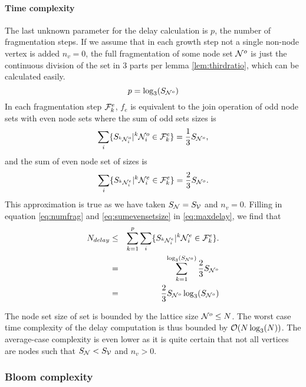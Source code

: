 \paragraph{Time complexity}
The last unknown parameter for the delay calculation is $p$, the number of fragmentation steps. If we assume that in each growth step not a single non-node vertex is added $n_v = 0$, the full fragmentation of some node set $\mathcal{N}^o$ is just the continuous division of the set in 3 parts per lemma \ref{lem:thirdratio}, which can be calculated easily.
\begin{equation}\label{eq:numfrag}
  p = \log_3(S_{\mathcal{N}^o})
\end{equation}
In each fragmentation step $\mathcal{F}^e_k$, $f_e$ is equivalent to the join operation of odd node sets with even node sets where the sum of odd sets sizes is
\begin{equation}\label{eq:sumoddsetsize}
  \sum_i \{ S_{{}^{k}\mathcal{N}_i^o} | {}^{k}\mathcal{N}_i^o \in \mathcal{F}^e_k \} = \frac{1}{3}S_{\mathcal{N}^o},
\end{equation}
and the sum of even node set of sizes is
\begin{equation}\label{eq:sumevensetsize}
  \sum_i \{ S_{{}^{k}\mathcal{N}_i^e} | {}^{k}\mathcal{N}_i^e \in \mathcal{F}^e_k \} = \frac{2}{3}S_{\mathcal{N}^o}.
\end{equation}
This approximation is true as we have taken $S_{\mathcal{N}} = S_{\mathcal{V}}$ and $n_v=0$. Filling in equation \ref{eq:numfrag} and \ref{eq:sumevensetsize} in \ref{eq:maxdelay}, we find that
\begin{eqnarray}
\nonumber  N_{delay} &\leq& \sum_{k=1}^{p} \sum_i \{ S_{{}^{k}\mathcal{N}_i^e} | {}^{k}\mathcal{N}_i^e \in \mathcal{F}^e_k \}. \\
\nonumber   &=& \sum_{k=1}^{\log_3(S_{\mathcal{N}^o})} \frac{2}{3}S_{\mathcal{N}^o} \\
   &=& \frac{2}{3}S_{\mathcal{N}^o}\log_3(S_{\mathcal{N}^o})
\end{eqnarray}

The node set size of set is bounded by the lattice size $\mathcal{N}^o \leq N$. The worst case time complexity of the delay computation is thus bounded by $\mathcal{O}(N\log_3(N))$. The average-case complexity is even lower as it is quite certain that not all vertices are nodes such that $S_{\mathcal{N}} < S_{\mathcal{V}}$ and $n_v > 0$.

\subsubsection{Bloom complexity}

